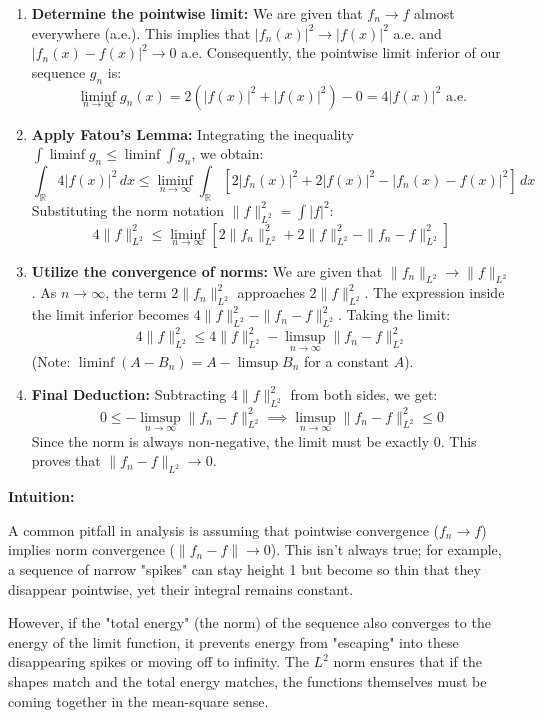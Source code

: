 \begin{solution}
\begin{enumerate}
    \item \textbf{Determine the pointwise limit:} We are given that $f_n \to f$ almost everywhere (a.e.). This implies that $|f_n(x)|^2 \to |f(x)|^2$ a.e. and $|f_n(x) - f(x)|^2 \to 0$ a.e. 
    Consequently, the pointwise limit inferior of our sequence $g_n$ is:
    \[ \liminf_{n\to\infty} g_n(x) = 2(|f(x)|^2 + |f(x)|^2) - 0 = 4|f(x)|^2 \text{ a.e.} \]

    \item \textbf{Apply Fatou's Lemma:} Integrating the inequality $\int \liminf g_n \leq \liminf \int g_n$, we obtain:
    \[ \int_{\mathbb{R}} 4|f(x)|^2 \, dx \leq \liminf_{n\to\infty} \int_{\mathbb{R}} [2|f_n(x)|^2 + 2|f(x)|^2 - |f_n(x) - f(x)|^2] \, dx \]
    Substituting the norm notation $\|f\|_{L^2}^2 = \int |f|^2$:
    \[ 4\|f\|_{L^2}^2 \leq \liminf_{n\to\infty} [2\|f_n\|_{L^2}^2 + 2\|f\|_{L^2}^2 - \|f_n - f\|_{L^2}^2] \]

    \item \textbf{Utilize the convergence of norms:} We are given that $\|f_n\|_{L^2} \to \|f\|_{L^2}$. As $n \to \infty$, the term $2\|f_n\|_{L^2}^2$ approaches $2\|f\|_{L^2}^2$. 
    The expression inside the limit inferior becomes $4\|f\|_{L^2}^2 - \|f_n - f\|_{L^2}^2$. 
    Taking the limit:
    \[ 4\|f\|_{L^2}^2 \leq 4\|f\|_{L^2}^2 - \limsup_{n\to\infty} \|f_n - f\|_{L^2}^2 \]
    (Note: $\liminf (A - B_n) = A - \limsup B_n$ for a constant $A$).

    \item \textbf{Final Deduction:} Subtracting $4\|f\|_{L^2}^2$ from both sides, we get:
    \[ 0 \leq -\limsup_{n\to\infty} \|f_n - f\|_{L^2}^2 \implies \limsup_{n\to\infty} \|f_n - f\|_{L^2}^2 \leq 0 \]
    Since the norm is always non-negative, the limit must be exactly 0. This proves that $\|f_n - f\|_{L^2} \to 0$.
\end{enumerate}
\par\medskip
\textbf{Intuition:}
\par\medskip
A common pitfall in analysis is assuming that pointwise convergence ($f_n \to f$) implies norm convergence ($\|f_n - f\| \to 0$). This isn't always true; for example, a sequence of narrow "spikes" can stay height 1 but become so thin that they disappear pointwise, yet their integral remains constant.
\par\medskip
However, if the "total energy" (the norm) of the sequence also converges to the energy of the limit function, it prevents energy from "escaping" into these disappearing spikes or moving off to infinity. The $L^2$ norm ensures that if the shapes match and the total energy matches, the functions themselves must be coming together in the mean-square sense.
\end{solution}

